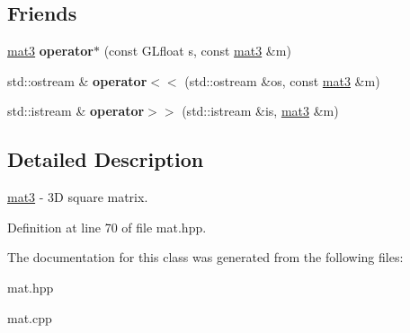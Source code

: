 \subsection*{\-Friends}
\begin{DoxyCompactItemize}
\item 
\hypertarget{class_angel_1_1mat3_ad9345c93609b63264fb4a4d48cef9e47}{\hyperlink{class_angel_1_1mat3}{mat3} {\bfseries operator$\ast$} (const \-G\-Lfloat s, const \hyperlink{class_angel_1_1mat3}{mat3} \&m)}\label{class_angel_1_1mat3_ad9345c93609b63264fb4a4d48cef9e47}

\item 
\hypertarget{class_angel_1_1mat3_a85d71885cc6797f2553701eb01c52851}{std\-::ostream \& {\bfseries operator$<$$<$} (std\-::ostream \&os, const \hyperlink{class_angel_1_1mat3}{mat3} \&m)}\label{class_angel_1_1mat3_a85d71885cc6797f2553701eb01c52851}

\item 
\hypertarget{class_angel_1_1mat3_aa6ac075e9f3776b3d6eba3e8207ab990}{std\-::istream \& {\bfseries operator$>$$>$} (std\-::istream \&is, \hyperlink{class_angel_1_1mat3}{mat3} \&m)}\label{class_angel_1_1mat3_aa6ac075e9f3776b3d6eba3e8207ab990}

\end{DoxyCompactItemize}


\subsection{\-Detailed \-Description}
\hyperlink{class_angel_1_1mat3}{mat3} -\/ 3\-D square matrix. 

\-Definition at line 70 of file mat.\-hpp.



\-The documentation for this class was generated from the following files\-:\begin{DoxyCompactItemize}
\item 
mat.\-hpp\item 
mat.\-cpp\end{DoxyCompactItemize}
